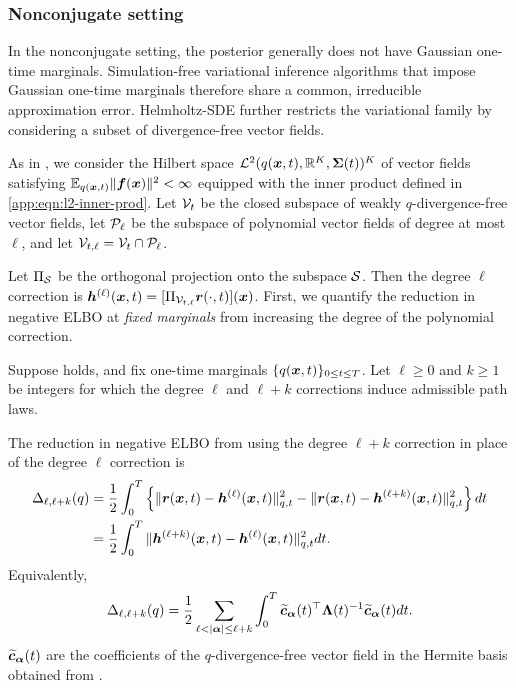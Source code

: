 \subsubsection{Nonconjugate setting}
\label{app:subsec:optimality-nonconj}

In the nonconjugate setting, the posterior generally does not have Gaussian one-time marginals.
Simulation-free variational inference algorithms that impose Gaussian one-time marginals therefore share a common, irreducible approximation error. 
Helmholtz-SDE further restricts the variational family by considering a subset of divergence-free vector fields.

As in , we consider the Hilbert space $\mathcal{L}^2(q(\boldsymbol{x}, t), \mathbb{R}^K, \boldsymbol{\Sigma}(t))^K$ of vector fields satisfying $\mathbb{E}_{q(\boldsymbol{x}, t)}\|\boldsymbol{f}(\boldsymbol{x})\|^2 < \infty$ equipped with the inner product defined in \cref{app:eqn:l2-inner-prod}.
Let $\mathcal{V}_t$ be the closed subspace of weakly $q$-divergence-free vector fields, let $\mathcal{P}_\ell$ be the subspace of polynomial vector fields of degree at most $\ell$, and let $\mathcal{V}_{t,\ell}=\mathcal{V}_t\cap\mathcal{P}_\ell$.

Let $\Pi_{\mathcal{S}}$ be the orthogonal projection onto the subspace $\mathcal{S}$.
Then the degree $\ell$ correction is $\boldsymbol{h}^{(\ell)}(\boldsymbol{x},t)= [\Pi_{\mathcal{V}_{t,\ell}}\boldsymbol{r}(\cdot,t)](\boldsymbol{x})$.
First, we quantify the reduction in negative ELBO at \emph{fixed marginals} from increasing the degree of the polynomial correction.
\begin{proposition}
\label{app:prop:polynomial-suboptimality}
Suppose  holds, and fix one-time marginals $\{q(\boldsymbol{x}, t)\}_{0 \leq t \leq T}$.
Let $\ell \geq 0$ and $k \geq 1$ be integers for which the degree $\ell$ and $\ell+k$ corrections induce admissible path laws.

The reduction in negative ELBO from using the degree $\ell+k$ correction in place of the degree $\ell$ correction is
\begin{equation}\label{app:eq:poly-suboptimality}
\begin{aligned}
\Delta_{\ell,\ell+k}(q)&=\frac{1}{2}\int_0^T \left\{\|\boldsymbol{r}(\boldsymbol{x},t)-\boldsymbol{h}^{(\ell)}(\boldsymbol{x},t)\|_{q,t}^2-\|\boldsymbol{r}(\boldsymbol{x},t)-\boldsymbol{h}^{(\ell+k)}(\boldsymbol{x},t)\|_{q,t}^2\right\}dt\\
&=\frac{1}{2}\int_0^T\|\boldsymbol{h}^{(\ell+k)}(\boldsymbol{x},t)-\boldsymbol{h}^{(\ell)}(\boldsymbol{x},t)\|_{q,t}^2dt.
\end{aligned}
\end{equation}
Equivalently,
\begin{equation}\label{app:eq:degree-est}
\Delta_{\ell,\ell+k}(q)=\frac{1}{2}\sum_{\ell<|\mbalpha|\leq\ell+k}\int_0^T\widetilde{\mbc}_{\mbalpha}(t)^{\top}\mbLambda(t)^{-1}\widetilde{\mbc}_{\mbalpha}(t)dt.
\end{equation}
$\widetilde{\boldsymbol{c}}_{\boldsymbol{\alpha}}(t)$ are the coefficients of the $q$-divergence-free vector field in the Hermite basis obtained from .
\end{proposition}

